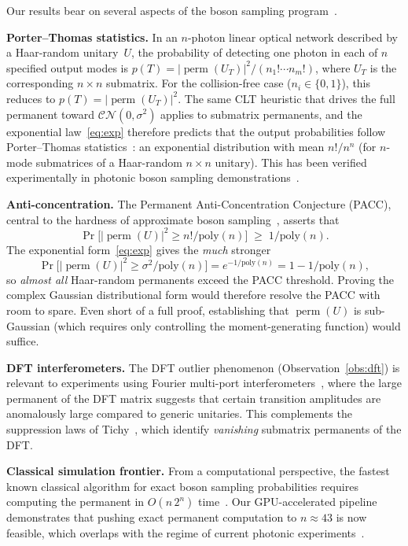 \documentclass[11pt]{amsart}
\theoremstyle{definition}
\theoremstyle{remark}
\DeclareMathOperator{\perm}{perm}
\begin{document}
Our results bear on several aspects of the boson sampling
program~\cite{AaronsonArkhipov13}.

\medskip\noindent\textbf{Porter--Thomas statistics.}
In an $n$-photon linear optical network described by a Haar-random
unitary~$U$, the probability of detecting one photon in each of $n$
specified output modes is $p(T)=|\perm(U_T)|^2/(n_1!\cdots n_m!)$,
where $U_T$ is the corresponding $n\times n$ submatrix.  For the
collision-free case ($n_i\in\{0,1\}$), this reduces to
$p(T)=|\perm(U_T)|^2$.  The same CLT heuristic that drives the full
permanent toward $\mathcal{CN}(0,\sigma^2)$ applies to submatrix
permanents, and the exponential law~\eqref{eq:exp} therefore predicts
that the output probabilities follow Porter--Thomas
statistics~\cite{PorterThomas56}: an exponential distribution with
mean $n!/n^n$ (for $n$-mode submatrices of a Haar-random $n\times n$
unitary).  This has been verified experimentally in photonic boson
sampling demonstrations~\cite{Zhong2020}.

\medskip\noindent\textbf{Anti-concentration.}
The Permanent Anti-Concentration Conjecture (PACC), central to the
hardness of approximate boson
sampling~\cite{AaronsonArkhipov13,FeffermanGhoshZhan24}, asserts that
\[
  \Pr\bigl[|\perm(U)|^2 \ge n!/\mathrm{poly}(n)\bigr]
  \;\ge\; 1/\mathrm{poly}(n).
\]
The exponential form~\eqref{eq:exp} gives the \emph{much} stronger
\[
  \Pr\bigl[|\perm(U)|^2 \ge \sigma^2/\mathrm{poly}(n)\bigr]
  = e^{-1/\mathrm{poly}(n)}
  = 1-1/\mathrm{poly}(n),
\]
so \emph{almost all} Haar-random permanents exceed the PACC threshold.
Proving the complex Gaussian distributional form would therefore
resolve the PACC with room to spare.  Even short of a full proof,
establishing that $\perm(U)$ is sub-Gaussian (which requires only
controlling the moment-generating function) would suffice.

\medskip\noindent\textbf{DFT interferometers.}
The DFT outlier phenomenon (Observation~\ref{obs:dft}) is relevant to
experiments using Fourier multi-port
interferometers~\cite{Crespi2016}, where the large permanent of the
DFT matrix suggests that certain transition amplitudes are anomalously
large compared to generic unitaries.
This complements the suppression laws of
Tichy~\cite{Tichy2014}, which identify \emph{vanishing}
submatrix permanents of the DFT.

\medskip\noindent\textbf{Classical simulation frontier.}
From a computational perspective, the fastest known classical algorithm
for exact boson sampling probabilities requires computing the
permanent in $O(n\,2^n)$ time~\cite{CliffordClifford18,Ryser63}.
Our GPU-accelerated pipeline demonstrates that pushing exact permanent
computation to $n\approx 43$ is now feasible, which overlaps with the
regime of current photonic experiments~\cite{Zhong2020}.
\end{document}
